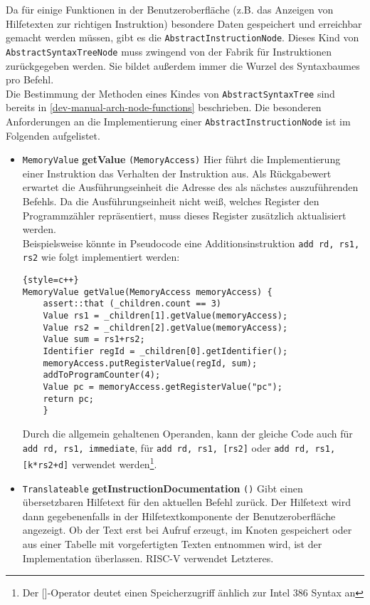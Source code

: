 Da für einige Funktionen in der Benutzeroberfläche (z.B. das Anzeigen von
Hilfetexten zur richtigen Instruktion) besondere Daten gespeichert und
erreichbar gemacht werden müssen, gibt es die \texttt{AbstractInstructionNode}.
Dieses Kind von \texttt{AbstractSyntaxTreeNode} muss zwingend von der Fabrik für
Instruktionen zurückgegeben werden. Sie bildet außerdem immer die Wurzel des
Syntaxbaumes pro Befehl.\\
Die Bestimmung der Methoden eines Kindes von \texttt{AbstractSyntaxTree} sind bereits in \autoref{dev-manual-arch-node-functions} beschrieben. Die besonderen Anforderungen an die Implementierung einer \texttt{AbstractInstructionNode} ist im Folgenden aufgelistet.

\begin{itemize}

  \item \texttt{MemoryValue} \textbf{getValue} \texttt{(MemoryAccess)} Hier
  führt die Implementierung einer Instruktion das Verhalten der Instruktion aus.
  Als Rückgabewert erwartet die Ausführungseinheit die Adresse des als nächstes
  auszuführenden Befehls. Da die Ausführungseinheit nicht weiß, welches Register
  den Programmzähler repräsentiert, muss dieses Register zusätzlich aktualisiert
  werden. \\ Beispielsweise könnte in Pseudocode eine Additionsinstruktion
  \texttt{add rd, rs1, rs2} wie folgt implementiert werden:

\begin{lstlisting}{style=c++}
MemoryValue getValue(MemoryAccess memoryAccess) {
	assert::that (_children.count == 3)
	Value rs1 = _children[1].getValue(memoryAccess);
	Value rs2 = _children[2].getValue(memoryAccess);
	Value sum = rs1+rs2;
	Identifier regId = _children[0].getIdentifier();
	memoryAccess.putRegisterValue(regId, sum);
	addToProgramCounter(4);
	Value pc = memoryAccess.getRegisterValue("pc");
	return pc;
	}
\end{lstlisting}

	Durch die allgemein gehaltenen Operanden, kann der gleiche Code auch für
	\texttt{add rd, rs1, immediate}, für \texttt{add rd, rs1, [rs2]} oder
	\texttt{add rd, rs1, [k*rs2+d]} verwendet werden\footnote{Der []-Operator
	deutet einen Speicherzugriff änhlich zur Intel 386 Syntax an}.

  \item \texttt{Translateable} \textbf{getInstructionDocumentation} \texttt{()}
  Gibt einen übersetzbaren Hilfetext für den aktuellen Befehl zurück. Der
  Hilfetext wird dann gegebenenfalls in der Hilfetextkomponente der
  Benutzeroberfläche angezeigt. Ob der Text erst bei Aufruf erzeugt, im Knoten
  gespeichert oder aus einer Tabelle mit vorgefertigten Texten entnommen wird,
  ist der Implementation überlassen. RISC-V verwendet Letzteres.

\end{itemize}

